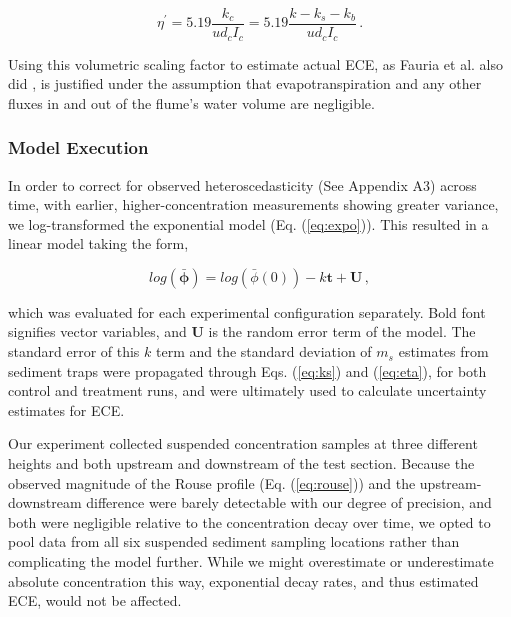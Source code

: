 \documentclass[geosciences,article,submit,moreauthors,pdftex]{Definitions/mdpi}
\begin{document}
\begin{equation}
    \eta^\prime = 5.19\frac{k_c}{ud_cI_c} = 5.19\frac{k - k_s - k_b}{ud_cI_c}\,.
    \label{eq:eta}
\end{equation}

\noindent Using this volumetric scaling factor to estimate actual ECE, as Fauria et al. also did \cite{Fauria_2015}, is justified under the assumption that evapotranspiration and any other fluxes in and out of the flume's water volume are negligible.

\subsubsection{Model Execution}

In order to correct for observed heteroscedasticity (See Appendix A3) across time, with earlier, higher-concentration measurements showing greater variance, we log-transformed the exponential model (Eq. (\ref{eq:expo})). This resulted in a linear model taking the form,

\begin{equation}
    log(\boldsymbol{\bar{\phi}}) = log(\bar{\phi}(0)) - k\boldsymbol{t} + \boldsymbol{U} \,,
\end{equation}

\noindent which was evaluated for each experimental configuration separately. Bold font signifies vector variables, and $\boldsymbol{U}$ is the random error term of the model. The standard error of this $k$ term and the standard deviation of $m_s$ estimates from sediment traps were propagated through Eqs. (\ref{eq:ks}) and (\ref{eq:eta}), for both control and treatment runs, and were ultimately used to calculate uncertainty estimates for ECE.

Our experiment collected suspended concentration samples at three different heights and both upstream and downstream of the test section. Because the observed magnitude of the Rouse profile (Eq. (\ref{eq:rouse})) and the upstream-downstream difference were barely detectable with our degree of precision, and both were negligible relative to the concentration decay over time, we opted to pool data from all six suspended sediment sampling locations rather than complicating the model further. While we might overestimate or underestimate absolute concentration this way, exponential decay rates, and thus estimated ECE, would not be affected.
\end{document}
